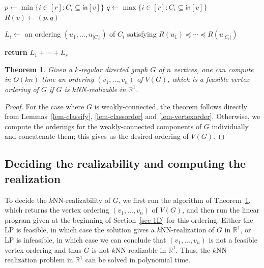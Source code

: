 \documentclass[11pt]{article}
\newtheorem{theorem}{Theorem}
\begin{document}
\begin{algorithm}[htbp]
    \caption{\textsc{VertexOrder}$(G,(C_1,\dots,C_r))$}
    \begin{algorithmic}[1]
            \State $p \leftarrow \min\{i \in [r]: C_i \subseteq \mathsf{in}[v]\}$
            \State $q \leftarrow \max\{i \in [r]: C_i \subseteq \mathsf{in}[v]\}$
            \State $R(v) \leftarrow (p,q)$
            \begin{nolinenumbers}
            \end{nolinenumbers}
        \EndFor
            \State $L_i \leftarrow$ an ordering $(u_1,\dots,u_{|C_i|})$ of $C_i$ satisfying $R(u_1) \preceq \cdots \preceq R(u_{|C_i|})$
            \begin{nolinenumbers}
            \end{nolinenumbers}
        \EndFor
        \State \textbf{return} $L_1+\cdots+L_r$
    \end{algorithmic}
    \label{alg-vertexorder}
\end{algorithm}

\begin{theorem} \label{thm-ordering}
Given a $k$-regular directed graph $G$ of $n$ vertices, one can compute in $O(kn)$ time an ordering $(v_1,\dots,v_n)$ of $V(G)$, which is a feasible vertex ordering of $G$ if $G$ is $k$NN-realizable in $\mathbb{R}^1$.
\end{theorem}
\begin{proof}
For the case where $G$ is weakly-connected, the theorem follows directly from Lemmas~\ref{lem-classify}, \ref{lem-classorder} and \ref{lem-vertexorder}.
Otherwise, we compute the orderings for the weakly-connected components of $G$ individually and concatenate them; this gives us the desired ordering of $V(G)$.
\end{proof}

\subsection{Deciding the realizability and computing the realization}

To decide the $k$NN-realizability of $G$, we first run the algorithm of Theorem~\ref{thm-ordering}, which returns the vertex ordering $(v_1,\dots,v_n)$ of $V(G)$, and then run the linear program given at the beginning of Section~\ref{sec-1D} for this ordering.
Either the LP is feasible, in which case the solution gives a $k$NN-realization of $G$ in $\mathbb{R}^1$, or LP is infeasible, in which case we can conclude that $(v_1,\dots,v_n)$ is not a feasible vertex ordering and thus $G$ is not $k$NN-realizable in $\mathbb{R}^1$. Thus, the $k$NN-realization problem in $\mathbb{R}^1$ can be solved in polynomial time.
\end{document}

